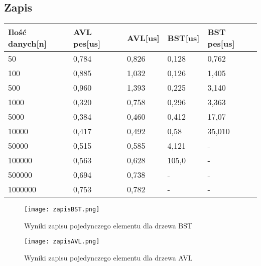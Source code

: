\documentclass[12pt,a4paper,titlepage]{article}
\begin{document}
\subsection{Zapis}

\begin{table}[h]
\begin{tabular}{|l|l|l|l|l|}
\hline
Ilość danych[n] & AVL pes[us] &AVL[us]   & BST[us] & BST pes[us]  \\ \hline
50 &0,784  &0,826 &0,128 &0,762 \\ \hline
100 &0,885  &1,032 &0,126  &1,405  \\ \hline
500 &0,960  &1,393 &0,225 &3,140  \\ \hline
1000 &0,320  &0,758 &0,296 &3,363  \\ \hline
5000 &0,384  &0,460 &0,412 &17,07  \\ \hline
10000 &0,417  &0,492&0,58 &35,010  \\ \hline
50000 &0,515  &0,585&4,121 & - \\ \hline
100000 &0,563  &0,628&105,0 &-  \\ \hline
500000 &0,694  &0,738& - & - \\ \hline
1000000 &0,753  &0,782&-  &-  \\ \hline
\end{tabular}
\end{table}
\newpage
\begin{figure}[!htbp]
\texttt{[image: zapisBST.png]}
\caption{Wyniki zapisu pojedynczego elementu dla drzewa BST}
\end{figure}
\newpage
\begin{figure}[!htbp]
\texttt{[image: zapisAVL.png]}
\caption{Wyniki zapisu pojedynczego elementu dla drzewa AVL}
\end{figure}
\end{document}
